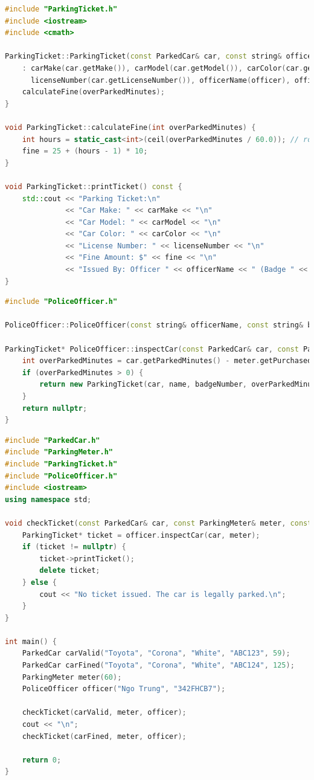 \documentclass{article}
\begin{document}
\begin{lstlisting}[language=C++, caption={ParkingTicket.cpp}]
#include "ParkingTicket.h"
#include <iostream>
#include <cmath>

ParkingTicket::ParkingTicket(const ParkedCar& car, const string& officer, const string& badge, int overParkedMinutes)
    : carMake(car.getMake()), carModel(car.getModel()), carColor(car.getColor()),
      licenseNumber(car.getLicenseNumber()), officerName(officer), officerBadgeNumber(badge) {
    calculateFine(overParkedMinutes);
}

void ParkingTicket::calculateFine(int overParkedMinutes) {
    int hours = static_cast<int>(ceil(overParkedMinutes / 60.0)); // rounding up
    fine = 25 + (hours - 1) * 10;
}

void ParkingTicket::printTicket() const {
    std::cout << "Parking Ticket:\n"
              << "Car Make: " << carMake << "\n"
              << "Car Model: " << carModel << "\n"
              << "Car Color: " << carColor << "\n"
              << "License Number: " << licenseNumber << "\n"
              << "Fine Amount: $" << fine << "\n"
              << "Issued By: Officer " << officerName << " (Badge " << officerBadgeNumber << ")\n";
}
\end{lstlisting}

\begin{lstlisting}[language=C++, caption={PoliceOfficer.cpp}]
#include "PoliceOfficer.h"

PoliceOfficer::PoliceOfficer(const string& officerName, const string& badge) : name(officerName), badgeNumber(badge) {}

ParkingTicket* PoliceOfficer::inspectCar(const ParkedCar& car, const ParkingMeter& meter) const {
    int overParkedMinutes = car.getParkedMinutes() - meter.getPurchasedMinutes();
    if (overParkedMinutes > 0) {
        return new ParkingTicket(car, name, badgeNumber, overParkedMinutes);
    }
    return nullptr;
}
\end{lstlisting}

\begin{lstlisting}[language=C++, caption={main.cpp}]
#include "ParkedCar.h"
#include "ParkingMeter.h"
#include "ParkingTicket.h"
#include "PoliceOfficer.h"
#include <iostream>
using namespace std;

void checkTicket(const ParkedCar& car, const ParkingMeter& meter, const PoliceOfficer& officer) {
    ParkingTicket* ticket = officer.inspectCar(car, meter);
    if (ticket != nullptr) {
        ticket->printTicket();
        delete ticket;
    } else {
        cout << "No ticket issued. The car is legally parked.\n";
    }
}

int main() {
    ParkedCar carValid("Toyota", "Corona", "White", "ABC123", 59);
    ParkedCar carFined("Toyota", "Corona", "White", "ABC124", 125);
    ParkingMeter meter(60);
    PoliceOfficer officer("Ngo Trung", "342FHCB7");

    checkTicket(carValid, meter, officer);
    cout << "\n";
    checkTicket(carFined, meter, officer);

    return 0;
}
\end{lstlisting}
\end{document}
